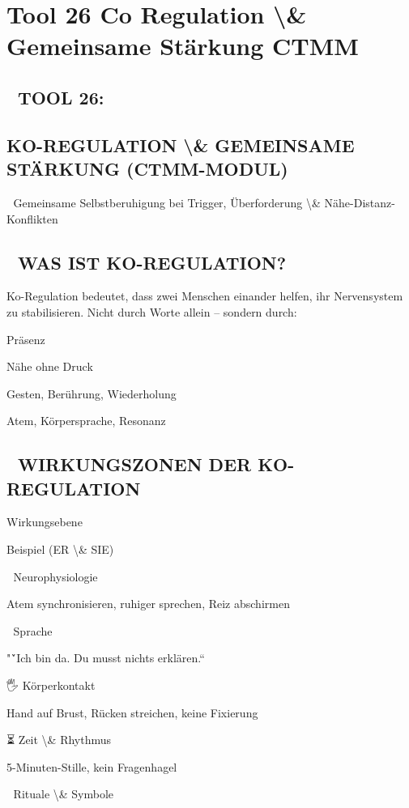\section{Tool 26 Co Regulation \textbackslash{}& Gemeinsame Stärkung CTMM}

\subsection{🧠 TOOL 26:}

\subsection{KO-REGULATION \textbackslash{}& GEMEINSAME STÄRKUNG (CTMM-MODUL)}

🧩 Gemeinsame Selbstberuhigung bei Trigger, Überforderung \textbackslash{}& Nähe-Distanz-Konflikten

\subsection{🤝 WAS IST KO-REGULATION?}

Ko-Regulation bedeutet, dass zwei Menschen einander helfen, ihr Nervensystem zu stabilisieren. Nicht durch Worte allein -- sondern durch:

Präsenz

Nähe ohne Druck

Gesten, Berührung, Wiederholung

Atem, Körpersprache, Resonanz

\subsection{💞 WIRKUNGSZONEN DER KO-REGULATION}

Wirkungsebene

Beispiel (ER \textbackslash{}& SIE)

🧠 Neurophysiologie

Atem synchronisieren, ruhiger sprechen, Reiz abschirmen

💬 Sprache

"\'`Ich bin da. Du musst nichts erklären.“

🖐️ Körperkontakt

Hand auf Brust, Rücken streichen, keine Fixierung

⏳ Zeit \textbackslash{}& Rhythmus

5-Minuten-Stille, kein Fragenhagel

🔄 Rituale \textbackslash{}& Symbole

